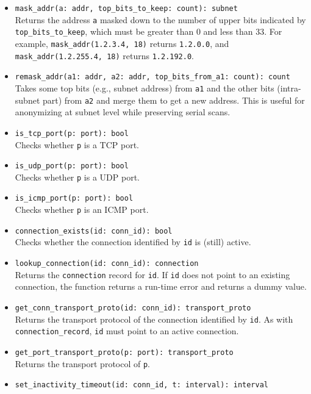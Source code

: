 \documentclass[10pt,landscape]{article}
\begin{document}
\begin{multicols*}{2}
\begin{itemize}
  \item \verb|mask_addr(a: addr, top_bits_to_keep: count): subnet|\\
    Returns the address \verb|a| masked down to the number of upper bits
    indicated by \verb|top_bits_to_keep|, which must be greater than 0 and less
    than 33. For example, \verb|mask_addr(1.2.3.4, 18)| returns \verb|1.2.0.0|,
    and \verb|mask_addr(1.2.255.4, 18)| returns \verb|1.2.192.0|.
  \item \verb|remask_addr(a1: addr, a2: addr, top_bits_from_a1: count): count|\\
    Takes some top bits (e.g., subnet address) from \texttt{a1} and the other
    bits (intra-subnet part) from \texttt{a2} and merge them to get a new
    address. This is useful for anonymizing at subnet level while preserving
    serial scans.
  \item \verb|is_tcp_port(p: port): bool|\\
    Checks whether \texttt{p} is a TCP port.
  \item \verb|is_udp_port(p: port): bool|\\
    Checks whether \texttt{p} is a UDP port.
  \item \verb|is_icmp_port(p: port): bool|\\
    Checks whether \texttt{p} is an ICMP port.
  \item \verb|connection_exists(id: conn_id): bool|\\
    Checks whether the connection identified by \texttt{id} is (still) active.
  \item \verb|lookup_connection(id: conn_id): connection|\\
    Returns the \texttt{connection} record for \texttt{id}. If
    \texttt{id} does not point to an existing connection, the function returns
    a run-time error and returns a dummy value.
  \item \verb|get_conn_transport_proto(id: conn_id): transport_proto|\\
    Returns the transport protocol of the connection identified by \texttt{id}.
    As with \verb|connection_record|, \texttt{id} must point to an active
    connection.
  \item \verb|get_port_transport_proto(p: port): transport_proto|\\
    Returns the transport protocol of \texttt{p}.
  \item \verb|set_inactivity_timeout(id: conn_id, t: interval): interval|\\

\end{itemize}
\end{multicols*}
\end{document}
